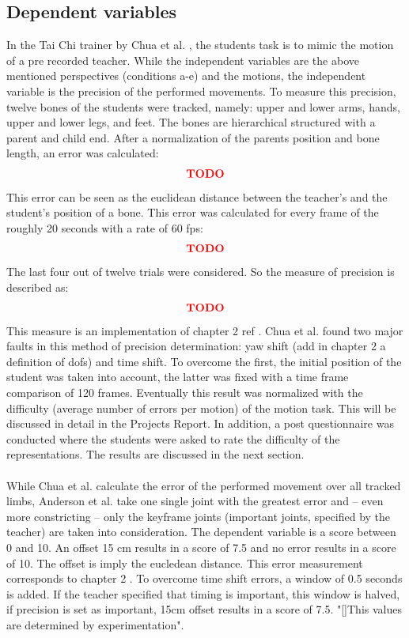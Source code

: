 \subsection{Dependent variables}
In the Tai Chi trainer by Chua et al. \cite{Chua}, the students task is to mimic the motion of a pre recorded teacher. While the independent variables are the above mentioned perspectives (conditions a-e) and the motions, the independent variable is the precision of the performed movements. To measure this precision, twelve bones of the students were tracked, namely: upper and lower arms, hands, upper and lower legs, and feet. The bones are hierarchical structured with a parent and child end. After a normalization of the parents position and bone length, an error was calculated:
\begin{equation}
	\textcolor{red}{\textbf{TODO}}
\end{equation}
This error can be seen as the euclidean distance between the teacher's and the student's position of a bone. This error was calculated for every frame of the roughly 20 seconds with a rate of 60 fps:
\begin{equation}
	\textcolor{red}{\textbf{TODO}}
\end{equation}
The last four out of twelve trials were considered. So the measure of precision is described as:
\begin{equation}
	\textcolor{red}{\textbf{TODO}}
\end{equation}
This measure is an implementation of chapter 2 ref \todo.
Chua et al. found two major faults in this method of precision determination: yaw shift (\todo add in chapter 2 a definition of dofs) and time shift. To overcome the first, the initial position of the student was taken into account, the latter was fixed with a time frame comparison of 120 frames. Eventually this result was normalized with the difficulty (average number of errors per motion) of the motion task. This will be discussed in detail in the Projects Report. In addition, a post questionnaire was conducted where the students were asked to rate the difficulty of the representations. The results are discussed in the next section.\\ \\
While Chua et al. calculate the error of the performed movement over all tracked limbs, Anderson et al. take one single joint with the greatest error and \--- even more constricting \--- only the keyframe joints (important joints, specified by the teacher) are taken into consideration. The dependent variable is a score between 0 and 10. An offset 15 cm results in a score of 7.5 and no error results in a score of 10. The offset is imply the eucledean distance. This error measurement corresponds to chapter 2 \todo. To overcome time shift errors, a window of 0.5 seconds is added. If the teacher specified that timing is important, this window is halved, if precision is set as important, 15cm offset results in a score of 7.5. "[]This values are determined by experimentation".\\ \\

